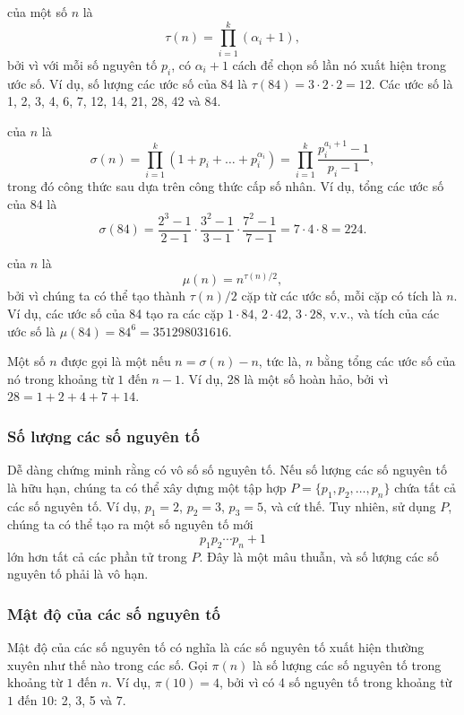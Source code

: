  của một số $n$ là
\[\tau(n)=\prod_{i=1}^k (\alpha_i+1),\]
bởi vì với mỗi số nguyên tố $p_i$, có
$\alpha_i+1$ cách để chọn số lần
nó xuất hiện trong ước số.
Ví dụ, số lượng các ước số
của 84 là
$\tau(84)=3 \cdot 2 \cdot 2 = 12$.
Các ước số là
1, 2, 3, 4, 6, 7, 12, 14, 21, 28, 42 và 84.

 của $n$ là
\[\sigma(n)=\prod_{i=1}^k (1+p_i+\ldots+p_i^{\alpha_i}) = \prod_{i=1}^k \frac{p_i^{a_i+1}-1}{p_i-1},\]
trong đó công thức sau dựa trên công thức cấp số nhân.
Ví dụ, tổng các ước số của 84 là
\[\sigma(84)=\frac{2^3-1}{2-1} \cdot \frac{3^2-1}{3-1} \cdot \frac{7^2-1}{7-1} = 7 \cdot 4 \cdot 8 = 224.\]

 của $n$ là
\[\mu(n)=n^{\tau(n)/2},\]
bởi vì chúng ta có thể tạo thành $\tau(n)/2$ cặp từ các ước số,
mỗi cặp có tích là $n$.
Ví dụ, các ước số của 84
tạo ra các cặp
$1 \cdot 84$, $2 \cdot 42$, $3 \cdot 28$, v.v.,
và tích của các ước số là $\mu(84)=84^6=351298031616$.


Một số $n$ được gọi là một  nếu $n=\sigma(n)-n$,
tức là, $n$ bằng tổng các ước số của nó
trong khoảng từ $1$ đến $n-1$.
Ví dụ, 28 là một số hoàn hảo,
bởi vì $28=1+2+4+7+14$.

\subsubsection{Số lượng các số nguyên tố}

Dễ dàng chứng minh rằng có vô số
số nguyên tố.
Nếu số lượng các số nguyên tố là hữu hạn,
chúng ta có thể xây dựng một tập hợp $P=\{p_1,p_2,\ldots,p_n\}$
chứa tất cả các số nguyên tố.
Ví dụ, $p_1=2$, $p_2=3$, $p_3=5$, và cứ thế.
Tuy nhiên, sử dụng $P$, chúng ta có thể tạo ra một số nguyên tố mới
\[p_1 p_2 \cdots p_n+1\]
lớn hơn tất cả các phần tử trong $P$.
Đây là một mâu thuẫn, và số lượng các số nguyên tố
phải là vô hạn.

\subsubsection{Mật độ của các số nguyên tố}

Mật độ của các số nguyên tố có nghĩa là các số nguyên tố xuất hiện
thường xuyên như thế nào trong các số.
Gọi $\pi(n)$ là số lượng các số nguyên tố trong khoảng từ
$1$ đến $n$. Ví dụ, $\pi(10)=4$, bởi vì
có 4 số nguyên tố trong khoảng từ $1$ đến $10$: 2, 3, 5 và 7.

